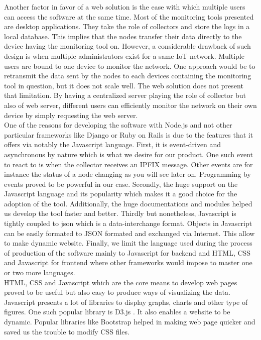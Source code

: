 Another factor in favor of a web solution is the ease with which multiple users can access the software at the same time. Most of the monitoring tools presented are desktop applications. They take the role of collectors and store the logs in a local database. This implies that the nodes transfer their data directly to the device having the monitoring tool on. However, a considerable drawback of such design is when multiple administrators exist for a same IoT network. Multiple users are bound to one device to monitor the network. One approach would be to retransmit the data sent by the nodes to each devices containing the monitoring tool in question, but it does not scale well. The web solution does not present that limitation. By having a centralized server playing the role of collector but also of web server, different users can efficiently monitor the network on their own device by simply requesting the web server. \\

One of the reasons for developing the software with Node.js and not other particular frameworks like Django or Ruby on Rails is due to the features that it offers via notably the Javascript language. First, it is event-driven and asynchronous by nature which is what we desire for our product. One such event to react to is when the collector receives an IPFIX message. Other events are for instance the status of a node changing as you will see later on. Programming by events proved to be powerful in our case. Secondly, the huge support on the Javascript language and its popularity which makes it a good choice for the adoption of the tool. Additionally, the huge documentations and modules helped us develop the tool faster and better. Thirdly but nonetheless, Javascript is tightly coupled to \acrfull{json} \cite{website:json} which is a data-interchange format. Objects in Javascript can be easily formated to JSON formated and exchanged via Internet. This allow to make dynamic website. Finally, we limit the language used during the process of production of the software mainly to Javascript for backend and HTML, CSS and Javascript for frontend where other frameworks would impose to master one or two more languages.\\

HTML, CSS and Javascript which are the core means to develop web pages proved to be useful but also easy to produce ways of visualizing the data. Javascript presents a lot of libraries to display graphs, charts and other type of figures. One such popular library is D3.js \cite{website:d3}. It also enables a website to be dynamic. Popular libraries like Bootstrap helped in making web page quicker and saved us the trouble to modify CSS files.\\

